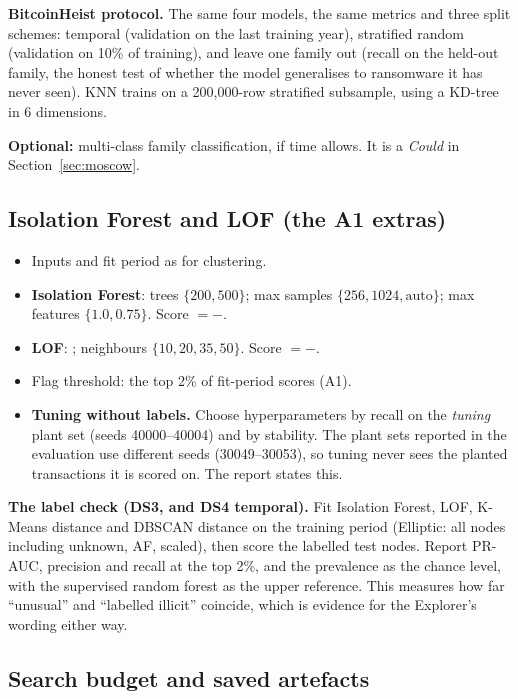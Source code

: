 \textbf{BitcoinHeist protocol.} The same four models, the same metrics and three split schemes:
temporal (validation on the last training year), stratified random (validation on 10\% of
training), and leave one family out (recall on the held-out family, the honest test of whether
the model generalises to ransomware it has never seen). KNN trains on a 200,000-row stratified
subsample, using a KD-tree in 6 dimensions.

\textbf{Optional:} multi-class family classification, if time allows. It is a \emph{Could} in
Section~\ref{sec:moscow}.

\subsection{Isolation Forest and LOF (the A1 extras)}
\label{sec:outliers}

\begin{itemize}
  \item Inputs and fit period as for clustering.
  \item \textbf{Isolation Forest}: trees $\{200, 500\}$; max samples $\{256, 1024,
    \text{auto}\}$; max features $\{1.0, 0.75\}$. Score $= -$.
  \item \textbf{LOF}: ; neighbours $\{10, 20, 35, 50\}$. Score $=
    -$.
  \item Flag threshold: the top 2\% of fit-period scores (A1).
  \item \textbf{Tuning without labels.} Choose hyperparameters by recall on the \emph{tuning}
    plant set (seeds 40000--40004) and by stability. The plant sets reported in the evaluation
    use different seeds (30049--30053), so tuning never sees the planted transactions it is
    scored on. The report states this.
\end{itemize}

\textbf{The label check (DS3, and DS4 temporal).} Fit Isolation Forest, LOF, K-Means distance and
DBSCAN distance on the training period (Elliptic: all nodes including unknown, AF, scaled), then
score the labelled test nodes. Report PR-AUC, precision and recall at the top 2\%, and the
prevalence as the chance level, with the supervised random forest as the upper reference. This
measures how far ``unusual'' and ``labelled illicit'' coincide, which is evidence for the
Explorer's wording either way.

\subsection{Search budget and saved artefacts}

